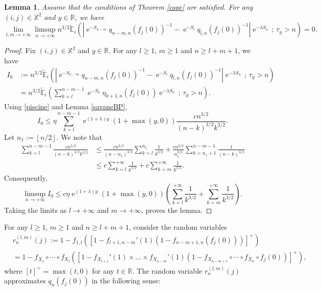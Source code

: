 \documentclass[12pt]{amsart}
\newtheorem{lemma}[theorem]{Lemma}
\theoremstyle{definition}
\numberwithin{equation}{section}
\newcommand*{\abs}[1]{\left\lvert#1\right\rvert}
\newcommand*{\pent}[1]{\left\lfloor#1\right\rfloor}
\def\bb#1{\mathbb{#1}}
\def\tbb#1{\tilde{\mathbb{#1}}}
\def\geq{\geqslant}
\def\leq{\leqslant}
\renewcommand\ll{\lambda}
\DeclareMathOperator{\e}{e}
\begin{document}
\begin{lemma} Assume that the conditions of Theorem \ref{cape} are satisfied.
\label{constellation}
For any $(i,j) \in \bb X^2$ and $y \in \bb R$, we have
\[
\lim_{l,m \to +\infty} \limsup_{n\to+\infty} n^{3/2} \tbb E_i \left( \abs{\e^{-S_{n-m}} q_{n-m,n}\left( f_j(0) \right)^{-1} - \e^{-S_l} q_{l,n}\left( f_j(0) \right)^{-1}} \e^{-\ll S_n} \,;\, \tau_y > n \right) = 0.
\]
\end{lemma}

\begin{proof}
Fix $(i,j) \in \bb X^2$ and $y \in \bb R$. For any $l \geq 1$, $m \geq 1$ and $n \geq l+m+1$, we have
\begin{align*}
I_0 &:= n^{3/2} \tbb E_i \left( \abs{\e^{-S_{n-m}} q_{n-m,n}\left( f_j(0) \right)^{-1} - \e^{-S_l} q_{l,n}\left( f_j(0) \right)^{-1}} \e^{-\ll S_n} \,;\, \tau_y > n \right) \\
&= n^{3/2} \tbb E_i \left( \sum_{k=l}^{n-m-1} \e^{-S_k} \eta_{k+1,n}\left( f_j(0) \right) \e^{-\ll S_n} \,;\, \tau_y > n \right).
\end{align*}
Using \eqref{piscine} and Lemma \ref{savaneBP},
\[
I_0 \leq \eta \sum_{k=l}^{n-m-1} \e^{(1+\ll) y} (1+\max(y,0)) \frac{c n^{3/2}}{(n-k)^{3/2}k^{3/2}}.
\]
Let $n_1 := \pent{n/2}$. We note that
\begin{align*}
\sum_{k=l}^{n-m-1} \frac{c n^{3/2}}{(n-k)^{3/2}k^{3/2}} &\leq \frac{c n^{3/2}}{(n-n_1)^{3/2}} \sum_{k=l}^{n_1} \frac{1}{k^{3/2}} + \frac{c n^{3/2}}{n_1^{3/2}}\sum_{k=n_1+1}^{n-m-1} \frac{1}{(n-k)^{3/2}} \\
&\leq c \sum_{k=l}^{+\infty} \frac{1}{k^{3/2}} + c \sum_{k=m}^{+\infty} \frac{1}{k^{3/2}}.
\end{align*}
Consequently,
\[
\limsup_{n\to +\infty} I_0 \leq c\eta \e^{(1+\ll) y} (1+\max(y,0)) \left( \sum_{k=l}^{+\infty} \frac{1}{k^{3/2}} + \sum_{k=m}^{+\infty} \frac{1}{k^{3/2}} \right).
\]
Taking the limits as $l \to +\infty$ and $m\to +\infty$, proves the lemma.
\end{proof}

For any $l \geq 1$, $m\geq 1$ and $n \geq l+m+1$, consider the random variables 
\begin{align*}
&r_n^{(l,m)}(j) := 1 - f_{1,l} \left( \left[ 1-f_{l+1,n-m}'(1) \left( 1-f_{n-m+1,n}\left( f_j(0) \right) \right) \right]^+ \right) \\
&= 1- f_{X_1}\circ \cdots \circ f_{X_l} \left( \left[ 1-f_{X_{l+1}}'(1) \times \dots \times f_{X_{n-m}}'(1) \left( 1-f_{X_{n-m+1}}\circ \cdots \circ f_{X_n} \circ f_j(0) \right) \right]^+ \right),
\end{align*}
where $[t]^+ = \max(t,0)$ for any $t\in \bb R$. The random variable $r_n^{(l,m)}(j)$ approximates $q_n\left( f_j(0) \right)$ in the following sense:
\end{document}
